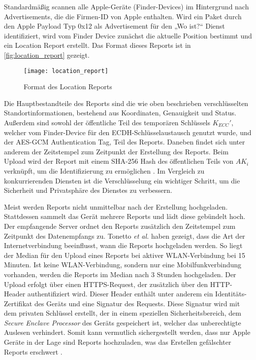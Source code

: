 Standardmäßig scannen alle Apple-Geräte (Finder-Devices) im Hintergrund nach Advertisements, die die Firmen-ID von Apple enthalten.
Wird ein Paket durch den Apple Payload Typ 0x12 als Advertisement für den „Wo ist?“ Dienst identifiziert, wird vom Finder Device zunächst die aktuelle Position bestimmt und ein Location Report erstellt.
Das Format dieses Reports ist in \autoref{fig:location_report} gezeigt.
\begin{figure}[ht]
    \centering
    \texttt{[image: location\_report]}
    \caption{Format des Location Reports \cite{Heinrich_FindMy}}
    \label{fig:location_report}
\end{figure}
Die Hauptbestandteile des Reports sind die wie oben beschrieben verschlüsselten Standortinformationen, bestehend aus Koordinaten, Genauigkeit und Status.
Außerdem sind sowohl der öffentliche Teil des temporären Schlüssels $K_{ECC}'$, welcher vom Finder-Device für den \ac{ECDH}-Schlüsselaustausch genutzt wurde, und der \ac{AES}-\ac{GCM} Authentication Tag, Teil des Reports.
Daneben findet sich unter anderem der Zeitstempel zum Zeitpunkt der Erstellung des Reports.
Beim Upload wird der Report mit einem \ac{SHA}-256 Hash des öffentlichen Teils von $AK_i$ verknüpft, um die Identifizierung zu ermöglichen \cite{Heinrich_FindMy}.
Im Vergleich zu konkurrierenden Diensten ist die Verschlüsselung ein wichtiger Schritt, um die Sicherheit und Privatsphäre des Dienstes zu verbessern.


Meist werden Reports nicht unmittelbar nach der Erstellung hochgeladen.
Stattdessen sammelt das Gerät mehrere Reports und lädt diese gebündelt hoch.
Der empfangende Server ordnet den Reports zusätzlich den Zeitstempel zum Zeitpunkt des Datenempfangs zu.
Tonetto \textit{et al.} \cite{Tonetto_FindMy} haben gezeigt, dass die Art der Internetverbindung beeinflusst, wann die Reports hochgeladen werden.
So liegt der Median für den Upload eines Reports bei aktiver WLAN-Verbindung bei 15 Minuten.
Ist keine WLAN-Verbindung, sondern nur eine Mobilfunkverbindung vorhanden, werden die Reports im Median nach 3 Stunden hochgeladen.
Der Upload erfolgt über einen HTTPS-Request, der zusätzlich über den HTTP-Header authentifiziert wird.
Dieser Header enthält unter anderem ein Identitäts-Zertifikat des Geräts und eine Signatur des Requests.
Diese Signatur wird mit dem privaten Schlüssel erstellt, der in einem speziellen Sicherheitsbereich, dem \textit{Secure Enclave Processor} des Geräts gespeichert ist, welcher das unberechtigte Auslesen verhindert.
Somit kann vermutlich sichergestellt werden, dass nur Apple Geräte in der Lage sind Reports hochzuladen, was das Erstellen gefälschter Reports erschwert \cite{Heinrich_FindMy}.


